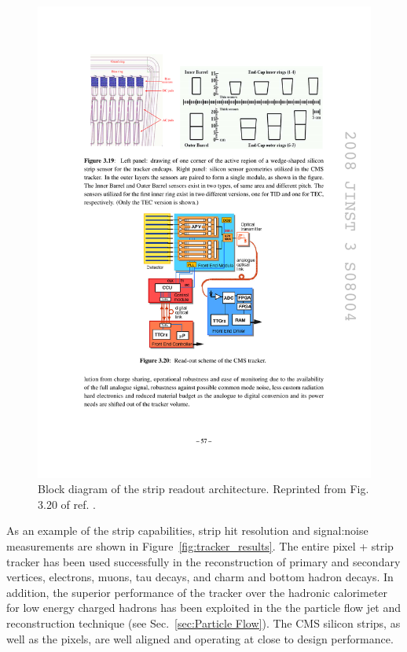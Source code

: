 \documentclass[dissertation.tex]{subfiles}
\begin{document}
\begin{figure}
	\centering
	\includegraphics[scale=1.0]{tracker_readout}
	\caption{Block diagram of the strip readout architecture.  Reprinted from Fig. 3.20 of ref. \cite{1748-0221-3-08-S08004}.}
	\label{fig:tracker_readout}
\end{figure}

As an example of the strip capabilities, strip hit resolution and signal:noise measurements are shown in Figure~\ref{fig:tracker_results}.  The entire pixel + strip tracker has been used successfully in the reconstruction of primary and secondary vertices, electrons, muons, tau decays, and charm and bottom hadron decays.  In addition, the superior performance of the tracker over the hadronic calorimeter for low energy charged hadrons has been exploited in the the particle flow jet and \MET reconstruction technique (see Sec.~\ref{sec:Particle Flow}).  The CMS silicon strips, as well as the pixels, are well aligned and operating at close to design performance.  
\end{document}
